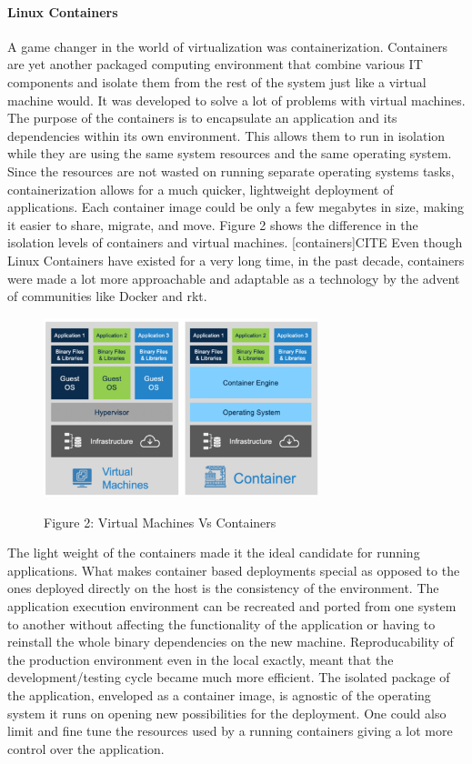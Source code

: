\documentclass[12pt,titlepage]{article}
\begin{document}
\paragraph{Linux Containers}
\label{sec:org9d3f646}
A game changer in the world of virtualization was containerization. Containers
are yet another packaged computing environment that combine various IT
components and isolate them from the rest of the system just like a virtual
machine would. It was developed to solve a lot of problems with virtual
machines. The purpose of the containers is to encapsulate an application and its
dependencies within its own environment. This allows them to run in isolation
while they are using the same system resources and the same operating system.
Since the resources are not wasted on running separate operating systems tasks,
containerization allows for a much quicker, lightweight deployment of
applications. Each container image could be only a few megabytes in size, making
it easier to share, migrate, and move. Figure 2 shows the difference in the
isolation levels of containers and virtual machines.
[containers]CITE Even though Linux Containers
have existed for a very long time, in the past decade, containers were made a
lot more approachable and adaptable as a
technology by the advent of communities like Docker and rkt.

\begin{figure}[!h]
    \caption{Figure 2: Virtual Machines Vs Containers}
    \centering
    \includegraphics[width=80mm]{./thesis_images/VM_image.PNG}
    \label{fig:vm_vs_containers}
\end{figure}

The light weight of the containers
made it the ideal candidate for running applications. What makes container based deployments special
as opposed to the ones deployed directly on the host is the consistency of the environment. The application
execution environment can be recreated and ported from one system to another without affecting the functionality
of the application or having to reinstall the whole binary dependencies on the new machine. Reproducability of the
production environment even in the local exactly, meant that the development/testing cycle became much more efficient.
The isolated package of the application, enveloped as a container image, is
agnostic of the operating system it runs on opening new possibilities for the
deployment. One could also limit and fine tune the resources used by a running
containers giving a lot more control over the application.
\end{document}
